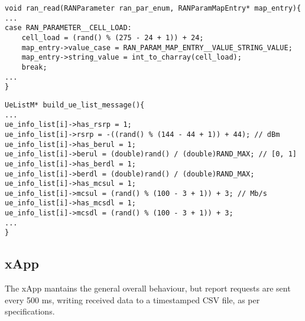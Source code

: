 \documentclass[a4paper,11pt]{article} %
\begin{document}
    \begin{verbatim}
void ran_read(RANParameter ran_par_enum, RANParamMapEntry* map_entry){
...
case RAN_PARAMETER__CELL_LOAD:
    cell_load = (rand() % (275 - 24 + 1)) + 24;
    map_entry->value_case = RAN_PARAM_MAP_ENTRY__VALUE_STRING_VALUE;
    map_entry->string_value = int_to_charray(cell_load);
    break;
...
}
    \end{verbatim}

    \begin{verbatim}
UeListM* build_ue_list_message(){
...
ue_info_list[i]->has_rsrp = 1;
ue_info_list[i]->rsrp = -((rand() % (144 - 44 + 1)) + 44); // dBm
ue_info_list[i]->has_berul = 1;
ue_info_list[i]->berul = (double)rand() / (double)RAND_MAX; // [0, 1]
ue_info_list[i]->has_berdl = 1;
ue_info_list[i]->berdl = (double)rand() / (double)RAND_MAX;
ue_info_list[i]->has_mcsul = 1;
ue_info_list[i]->mcsul = (rand() % (100 - 3 + 1)) + 3; // Mb/s
ue_info_list[i]->has_mcsdl = 1;
ue_info_list[i]->mcsdl = (rand() % (100 - 3 + 1)) + 3;
...
}
    \end{verbatim}

    \subsection{xApp}\label{subsec:xapp}

    The xApp mantains the general overall behaviour, but report requests are sent every 500 ms, writing received data to a timestamped CSV file, as per specifications.
\end{document}
